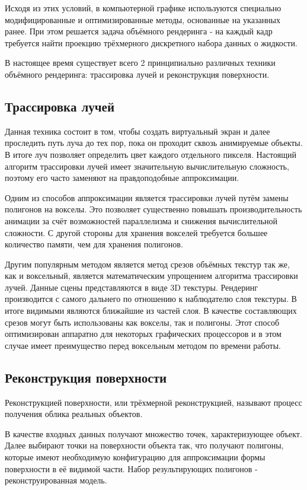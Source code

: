 Исходя из этих условий, в компьютерной графике используются специально модифицированные
и оптимизированные методы, основанные на указанных ранее. При этом решается задача объёмного
рендеринга - на каждый кадр требуется найти проекцию трёхмерного дискретного набора данных
о жидкости\cite{article:fastvolume}.

В настоящее время существует всего 2 принципиально различных техники объёмного рендеринга:
трассировка лучей и реконструкция поверхности\cite{book:ash}.

\subsection{Трассировка лучей}

Данная техника состоит в том, чтобы создать виртуальный экран и далее проследить
путь луча до тех пор, пока он проходит сквозь анимируемые объекты. В итоге луч
позволяет определить цвет каждого отдельного пикселя. Настоящий алгоритм трассировки лучей
имеет значительную вычислительную сложность, поэтому его часто заменяют на
правдоподобные аппроксимации\cite{book:ash}.

Одним из способов аппроксимации является трассировки лучей путём
замены полигонов на вокселы. Это позволяет существенно повышать производительность
анимации за счёт возможностей параллелизма и снижения вычислительной сложности.
С другой стороны для хранения вокселей требуется большее количество
памяти, чем для хранения полигонов.

Другим популярным методом является метод срезов объёмных текстур так же, как и воксельный, является математическим упрощением алгоритма трассировки лучей.
Данные сцены представляются в виде 3D текстуры. Рендеринг производится с самого дальнего
 по отношению к наблюдателю слоя текстуры. В итоге видимыми являются ближайшие из частей
 слоя.
 В качестве составляющих срезов могут быть использованы как вокселы, так и полигоны.
 Этот способ оптимизирован аппаратно для некоторых графических процессоров
 и в этом случае имеет преимущество перед воксельным методом по времени работы.

\subsection{Реконструкция поверхности}

Реконструкцией поверхности, или трёхмерной реконструкцией, называют процесс
получения облика реальных объектов.

В качестве входных данных получают множество точек, характеризующее объект.
Далее выбирают точки на поверхности объекта так, что получают полигоны, которые
имеют необходимую конфигурацию для аппроксимации формы поверхности в её видимой части.
Набор результирующих полигонов - реконструированная модель.

